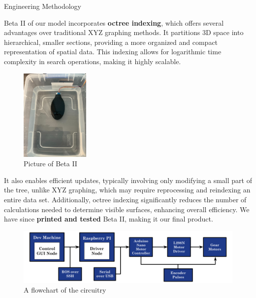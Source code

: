\documentclass[final, 16pt]{beamer}
\newlength{\colwidth}
\newlength{\twocolwidth}
\begin{document}
\begin{frame}[t]
\begin{columns}[t]
\begin{column}{\twocolwidth}
\begin{block}{Engineering Methodology}
\begin{minipage}[t]{0.48\linewidth}
    \end{minipage}\hfill%
    \begin{minipage}[t]{0.48\linewidth}

      Beta II of our model incorporates \textbf{octree indexing}, which offers several advantages over traditional XYZ graphing methods. It partitions 3D space into hierarchical, smaller sections, providing a more organized and compact representation of spatial data. This indexing allows for logarithmic time complexity in search operations, making it highly scalable. 
      
      \begin{figure}
        \centering
        \vspace*{-1.5cm}
        \includegraphics[scale=0.15, height=0.30\textwidth, width=0.30\textwidth]{img/Beta_II.jpg}
        \caption{Picture of Beta II}
        \label{fig:beta-ii}
      \end{figure}

      It also enables efficient updates, typically involving only modifying a small part of the tree, unlike XYZ graphing, which may require reprocessing and reindexing an entire data set. Additionally, octree indexing significantly reduces the number of calculations needed to determine visible surfaces, enhancing overall efficiency. We have since \textbf{printed and tested} Beta II, making it our final product.

      \begin{figure}[H]
        \centering
        \includegraphics[width=0.95\linewidth]{img/Circuit_Flow_Chart.png}
        \caption{A flowchart of the circuitry}
        \label{fig:circuit-flow-chart}
      \end{figure}
    \end{minipage}


\end{block}
\end{column}
\end{columns}
\end{frame}
\end{document}
